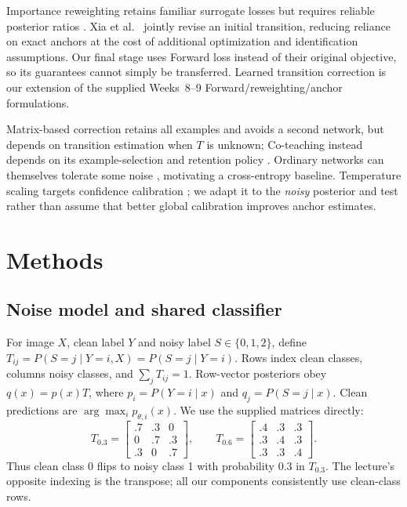 \documentclass[12pt]{article}
\begin{document}
Importance reweighting retains familiar surrogate losses but requires reliable posterior ratios \cite{liu2016}. Xia et al.~\cite{xia2019} jointly revise an initial transition, reducing reliance on exact anchors at the cost of additional optimization and identification assumptions. Our final stage uses Forward loss instead of their original objective, so its guarantees cannot simply be transferred. Learned transition correction is our extension of the supplied Weeks~8--9 Forward/reweighting/anchor formulations.

Matrix-based correction retains all examples and avoids a second network, but depends on transition estimation when $T$ is unknown; Co-teaching instead depends on its example-selection and retention policy \cite{han2018coteaching}. Ordinary networks can themselves tolerate some noise \cite{rolnick2017}, motivating a cross-entropy baseline. Temperature scaling targets confidence calibration \cite{guo2017}; we adapt it to the \emph{noisy} posterior and test rather than assume that better global calibration improves anchor estimates.

\section{Methods}
\subsection{Noise model and shared classifier}
For image $X$, clean label $Y$ and noisy label $S\in\{0,1,2\}$, define $T_{ij}=P(S=j\mid Y=i,X)=P(S=j\mid Y=i)$. Rows index clean classes, columns noisy classes, and $\sum_jT_{ij}=1$. Row-vector posteriors obey $q(x)=p(x)T$, where $p_i=P(Y=i\mid x)$ and $q_j=P(S=j\mid x)$. Clean predictions are $\arg\max_i p_{\theta,i}(x)$. We use the supplied matrices directly:
\begin{equation}
T_{0.3}=\begin{bmatrix}.7&.3&0\\0&.7&.3\\.3&0&.7\end{bmatrix},\qquad
T_{0.6}=\begin{bmatrix}.4&.3&.3\\.3&.4&.3\\.3&.3&.4\end{bmatrix}.
\label{eq:known}
\end{equation}
Thus clean class 0 flips to noisy class 1 with probability 0.3 in $T_{0.3}$. The lecture's opposite indexing is the transpose; all our components consistently use clean-class rows.
\end{document}
